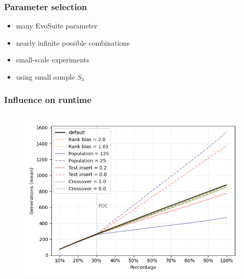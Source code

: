 \begin{frame}
	\frametitle{Parameter selection}
	
	\begin{itemize}
		\item many EvoSuite parameter
		\item nearly infinite possible combinations
		\item small-scale experiments
		\item using small sample $S_3$
	\end{itemize}
	
\end{frame}

\begin{frame}
	\frametitle{Influence on runtime}
	\begin{figure}
		\includegraphics[height=0.9\textheight]{figures/generations_parameter}
	\end{figure}	
\end{frame}

